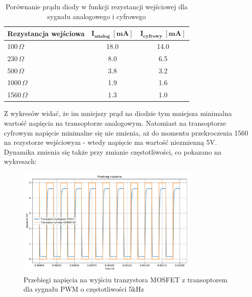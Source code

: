 \documentclass[11pt]{article}
\begin{document}
\begin{table}[H]
\centering
\begin{tabular}{|l|c|c|}
\hline
\textbf{Rezystancja wejściowa} & \(\mathbf{I_{analog} \ [mA]}\) & \(\mathbf{I_{cyfrowy} \ [mA]}\) \\
\hline
100\,$\Omega$ & 18.0 & 14.0 \\
\hline
230\,$\Omega$ & 8.0 & 6.5 \\
\hline
500\,$\Omega$ & 3.8 & 3.2 \\
\hline
1000\,$\Omega$ & 1.9 & 1.6 \\
\hline
1560\,$\Omega$ & 1.3 & 1.0 \\
\hline
\end{tabular}
\caption{Porównanie prądu diody w funkcji rezystancji wejściowej dla sygnału analogowego i cyfrowego}
\label{tab:diode_current_comparison}
\end{table}

Z wykresów widać, że im mniejszy prąd na diodzie tym mniejsza minimalna wartość napięcia na transoptorze analogowym. Natomiast na transoptorze cyfrowym napięcie minimalne się nie zmienia, aż do momentu przekroczenia 1560 \Omega na rezystorze wejściowym - wtedy napięcie ma wartość niezmienną 5V. \\

Dynamika zmienia się także przy zmianie częstotliwości, co pokazano na wykresach: \\

\begin{figure}[H]
\centering
\includegraphics[width=0.8\textwidth]{aun1_gate_circuit_digital_vs_analog_5khz.pdf}
\caption{Przebiegi napięcia na wyjściu tranzystora MOSFET z transoptorem dla sygnału PWM o częstotliwości 5kHz}
\end{figure}
\end{document}
